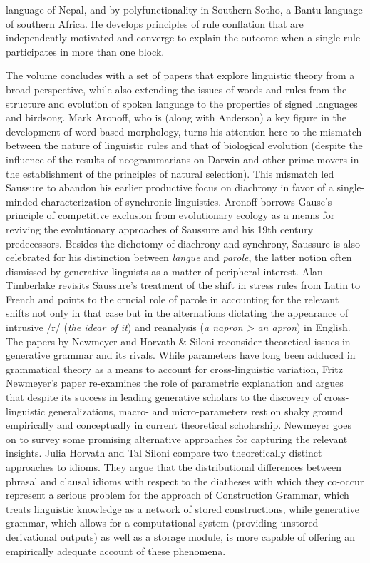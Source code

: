 \begin{refsection}
language of Nepal, and by polyfunctionality in Southern Sotho, a Bantu language of southern Africa.  He develops principles of rule conflation that are independently motivated and converge to explain the outcome when a single rule participates in more than one block. 

The volume concludes with a set of papers that explore linguistic theory from a broad perspective, while also extending the issues of words and rules from the structure and evolution of spoken language to the properties of signed languages and birdsong.  Mark Aronoff, who is (along with Anderson) a key figure in the development of word-based morphology, turns his attention here to the mismatch between the nature of linguistic rules and that of biological evolution (despite the influence of the results of neogrammarians on Darwin and other prime movers in the establishment of the principles of natural selection). This mismatch led Saussure to abandon his earlier productive focus on diachrony in favor of a single-minded characterization of synchronic linguistics. Aronoff borrows Gause's principle of competitive exclusion from evolutionary ecology as a means for reviving the evolutionary approaches of Saussure and his 19th century predecessors. Besides the dichotomy of diachrony and synchrony, Saussure is also celebrated for his distinction between \textit{langue} and \textit{parole}, the latter notion often dismissed by generative linguists as a matter of peripheral interest. Alan Timberlake revisits Saussure's treatment of the shift in stress rules from Latin to French and points to the crucial role of parole in accounting for the relevant shifts not only in that case but in the alternations dictating the appearance of intrusive /r/ (\textit{the idear of it}) and reanalysis (\textit{a napron > an apron}) in English.  The papers by Newmeyer and Horvath \& Siloni reconsider theoretical issues in generative grammar and its rivals.  While parameters have long been adduced in grammatical theory as a means to account for cross-linguistic variation, Fritz Newmeyer's paper re-examines the role of parametric explanation and argues that despite its success in leading generative scholars to the discovery of cross-linguistic generalizations, macro- and micro-parameters rest on shaky ground empirically and conceptually in current theoretical scholarship. Newmeyer goes on to survey some promising alternative approaches for capturing the relevant insights.  Julia Horvath and Tal Siloni compare two theoretically distinct approaches to idioms.  They argue that the distributional differences between phrasal and clausal idioms with respect to the diatheses with which they co-occur represent a serious problem for the approach of Construction Grammar, which treats linguistic knowledge as a network of stored constructions, while generative grammar, which allows for a computational system (providing unstored derivational outputs) as well as a storage module, is more capable of offering an empirically adequate account of these phenomena.


\end{refsection}
